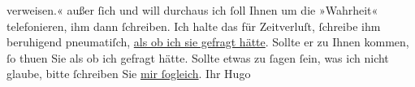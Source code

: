 \begin{ledgroupsized}[t]{13cm}
{{{                        verweisen.}}}\label{K_L00769_1h}« außer ſich und will durchaus ich ſoll Ihnen um die
                    »Wahrheit« telefonieren, ihm dann ſchreiben. Ich halte das für Zeitverluſt,
                    ſchreibe ihm beruhigend pneumatiſch, \uline{als ob ich sie
                        gefragt hätte}. Sollte er zu Ihnen kommen, ſo thuen Sie als ob ich
                    gefragt hätte. Sollte etwas zu ſagen ſein, was ich nicht glaube, bitte ſchreiben
                    Sie \uline{mir ſogleich}.\pend
           \pstart Ihr \spacefill\mbox{Hugo}\pend{}\endnumbering{}\end{ledgroupsized}  \newcommand{\dateiname}{L00769}\newcommand{\titel}{Hugo von Hofmannsthal an Arthur Schnitzler, 25. 1. 1898}\newcommand{\editorInnen}{Martin Anton Müller und Gerd-Hermann Susen}
      